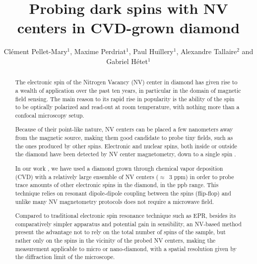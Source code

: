 \documentclass[aps,twocolumn,showpacs]{revtex4-1}
\begin{document}
\title{Probing dark spins with NV centers in CVD-grown diamond}

\author{Clément Pellet-Mary$^{1}$, Maxime Perdriat$^1$, Paul Huillery$^1$, Alexandre Tallaire$^2$ and Gabriel Hétet$^1$}

\begin{abstract}
\normalsize
The electronic spin of the Nitrogen Vacancy (NV) center in diamond has given rise to a wealth of application over the past ten years, in particular in the domain of magnetic field sensing. The main reason to its rapid rise in popularity is the ability of the spin to be optically polarized and read-out at room temperature, with nothing more than a confocal microscopy setup. 

Because of their point-like nature, NV centers can be placed a few nanometers away from the magnetic source, making them good candidate to probe tiny fields, such as the ones produced by other spins. Electronic and nuclear spins, both inside or outside the diamond have been detected by NV center magnetometry, down to a single spin \citep{Ref1}.

In our work \citep{Ref2}, we have used a diamond grown through chemical vapor deposition (CVD) with a relatively large ensemble of NV centers ($\approx$~3 ppm) in order to probe trace amounts of other electronic spins in the diamond, in the ppb range. This technique relies on resonant dipole-dipole coupling between the spins (flip-flop) \citep{Ref3} and unlike many NV magnetometry protocols does not require a microwave field. 

Compared to traditional electronic spin resonance technique such as EPR, besides its comparatively simpler apparatus and potential gain in sensibility, an NV-based method present the advantage not to rely on the total number of spins of the sample, but rather only on the spins in the vicinity of the probed NV centers, making the measurement applicable to micro or nano-diamond, with a spatial resolution given by the diffraction limit of the microscope.


\end{abstract}
\end{document}
